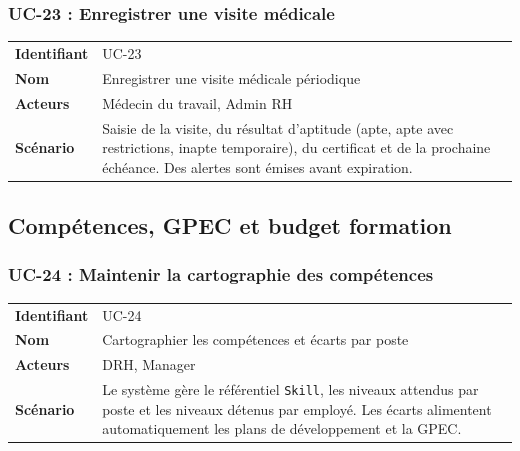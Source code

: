 \documentclass[a4paper,12pt,openany]{book}
\begin{document}
    \subsubsection*{UC-23 : Enregistrer une visite médicale}
    \begin{table}[H]
        \centering
        \begin{tabularx}{\textwidth}{lX}
    \toprule
    \textbf{Identifiant} & UC-23 \\
    \textbf{Nom}         & Enregistrer une visite médicale périodique \\
    \textbf{Acteurs}     & Médecin du travail, Admin RH \\
    \midrule
    \textbf{Scénario} & Saisie de la visite, du résultat d'aptitude (apte, apte avec restrictions, inapte temporaire), du certificat et de la prochaine échéance. Des alertes sont émises avant expiration. \\
    \bottomrule
        \end{tabularx}
    \end{table}


    \subsection{Compétences, GPEC et budget formation}

    \subsubsection*{UC-24 : Maintenir la cartographie des compétences}
    \begin{table}[H]
        \centering
        \begin{tabularx}{\textwidth}{lX}
    \toprule
    \textbf{Identifiant} & UC-24 \\
    \textbf{Nom}         & Cartographier les compétences et écarts par poste \\
    \textbf{Acteurs}     & DRH, Manager \\
    \midrule
    \textbf{Scénario} & Le système gère le référentiel \texttt{Skill}, les niveaux attendus par poste et les niveaux détenus par employé. Les écarts alimentent automatiquement les plans de développement et la GPEC. \\
    \bottomrule
        \end{tabularx}
    \end{table}
\end{document}
